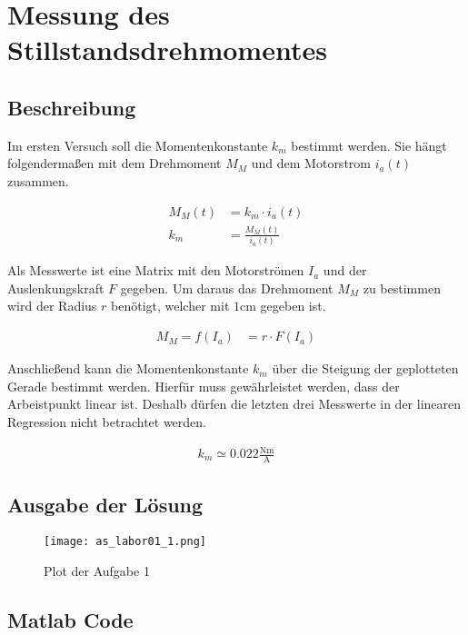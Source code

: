 \section{Messung des Stillstandsdrehmomentes}

\subsection{Beschreibung}

Im ersten Versuch soll die Momentenkonstante $k_m$ bestimmt werden.
Sie hängt folgendermaßen mit dem Drehmoment $M_M$ und dem Motorstrom $i_a(t)$
zusammen. 

\begin{equation} \label{eq111}
    \begin{split}
        M_M(t)&=k_m \cdot i_a(t)\\
        k_m&=\frac{M_M(t)}{i_a(t)}
    \end{split}
\end{equation}

Als Messwerte ist eine Matrix mit den Motorströmen $I_a$ und der Auslenkungskraft $F$
gegeben. Um daraus das Drehmoment $M_M$ zu bestimmen wird der Radius $r$ benötigt,
welcher mit $1 \mathrm{cm}$ gegeben ist.

\begin{equation} \label{eq112}
    \begin{split}
        M_M=f(I_a)&=r \cdot F(I_a)
    \end{split}
\end{equation}

Anschließend kann die Momentenkonstante $k_m$ über die Steigung der geplotteten
Gerade bestimmt werden. Hierfür muss gewährleistet werden, dass der Arbeistpunkt
linear ist. Deshalb dürfen die letzten drei Messwerte in der linearen Regression
nicht betrachtet werden.

\begin{equation} \label{eq113}
    \begin{split}
        k_m\simeq 0.022 \mathrm{\frac{Nm}{A}}
    \end{split}
\end{equation}






\subsection{Ausgabe der Lösung}
\begin{figure}[H]
 \centering
 \texttt{[image: as\_labor01\_1.png]}
 \caption{Plot der Aufgabe 1}
 \label{fig:PlotAufgabe1}
\end{figure}

\subsection{Matlab Code}

